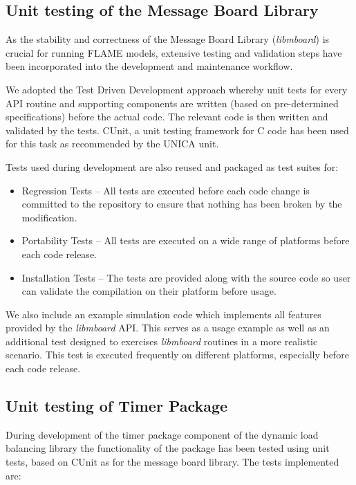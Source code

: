 \subsection{Unit testing of the Message Board Library}

As the stability and correctness of the Message Board Library (\textit{libmboard}) is crucial for running FLAME models, extensive testing and validation steps have been incorporated into the development and maintenance workflow. 

We adopted the Test Driven Development approach whereby unit tests for every API routine and supporting components are written (based on pre-determined specifications) before the actual code. The relevant code is then written and validated by the tests. CUnit, a unit testing framework for C code has been used for this task as recommended by the UNICA unit.

Tests used during development are also reused and packaged as test suites for:
\begin{itemize}
\item Regression Tests -- All tests are executed before each code change is committed to the repository to ensure that nothing has been broken by the modification.
\item Portability Tests -- All tests are executed on a wide range of platforms before each code release.
\item Installation Tests -- The tests are provided along with the source code so user can validate the compilation on their platform before usage.
\end{itemize}

We also include an example simulation code which implements all features provided by the \textit{libmboard} API. This serves as a usage example as well as an additional test designed to exercises \textit{libmboard} routines in a more realistic scenario. This test is executed frequently on different platforms, especially before each code release.

\subsection{Unit testing of Timer Package}

During development of the timer package component of the dynamic load balancing library the functionality of the package has been tested using unit tests, based on CUnit as for the message board library.  The tests implemented are:

